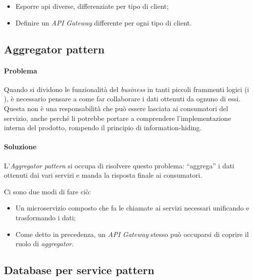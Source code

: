 \begin{itemize}
	\item Esporre \gls{api} diverse, differenziate per tipo di client;
	\item Definire un \textit{API Gateway} differente per ogni tipo di client.
\end{itemize}


\subsection{Aggregator pattern}

\paragraph*{Problema} Quando si dividono le funzionalità del \textit{business} in tanti piccoli frammenti logici (i ), è necessario pensare
a come far collaborare i dati ottenuti da ognuno di essi.
Questa non è una responsabilità che può essere lasciata ai consumatori del servizio, anche perché li potrebbe portare a comprendere l'implementazione interna del prodotto, rompendo il principio di \gls{information-hiding}\gloss.

\paragraph*{Soluzione} L'\textit{Aggregator pattern} si occupa di risolvere questo problema: ``aggrega'' i dati ottenuti dai vari servizi e
manda la risposta finale ai consumatori.

Ci sono due modi di fare ciò:
\begin{itemize}
	\item Un \gls{microservizio} composto che fa le chiamate ai servizi necessari
	unificando e trasformando i dati;
	\item Come detto in precedenza, un \textit{API Gateway} stesso può occuparsi di coprire il ruolo di \textit{aggregator}.
\end{itemize}


\subsection{Database per service pattern}

